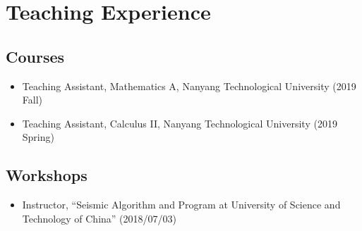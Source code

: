 \section{Teaching Experience}

\subsection{Courses}
\begin{itemize}
\item Teaching Assistant, Mathematics A, Nanyang Technological University (2019 Fall)
\item Teaching Assistant, Calculus II, Nanyang Technological University (2019 Spring)
\end{itemize}

\subsection{Workshops}
\begin{itemize}
\item Instructor, ``Seismic Algorithm and Program at University of Science and Technology of China'' (2018/07/03)
\end{itemize}

